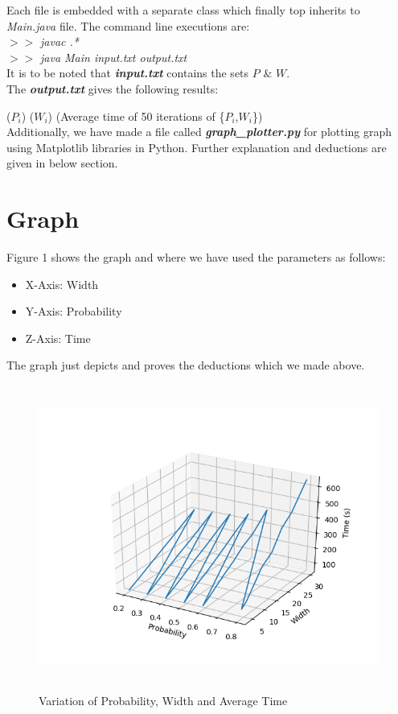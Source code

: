 \documentclass[12pt]{article}
\begin{document}
Each file is embedded with a separate class which finally top inherits to \textit{Main.java} file. The command line executions are: \\
$>>$ \textit{javac .*} \\
$>>$ \textit{java Main input.txt output.txt} \\ 

It is to be noted that \textbf{\textit{input.txt}} contains the sets $P$ \& $W$.
\\


The \textbf{\textit{output.txt}} gives the following results: 


($P_i$) ($W_i$) (Average time of 50 iterations of \{$P_i$,$W_i$\})
\\

Additionally, we have made a file called \textbf{\textit{graph\_plotter.py}} for plotting graph using Matplotlib libraries in Python. Further explanation and deductions are given in below section.

\section{Graph}
Figure 1 shows the graph and where we have used the parameters as follows:
\begin{itemize}
    \item X-Axis: Width
    \item Y-Axis: Probability
    \item Z-Axis: Time
\end{itemize}

The graph just depicts and proves the deductions which we made above.
\begin{center}
    \begin{figure}
        \centering
        \includegraphics[width=15cm, height=10cm]{graph.png}
        \caption{Variation of Probability, Width and Average Time}
    \end{figure}
\end{center}
\end{document}
